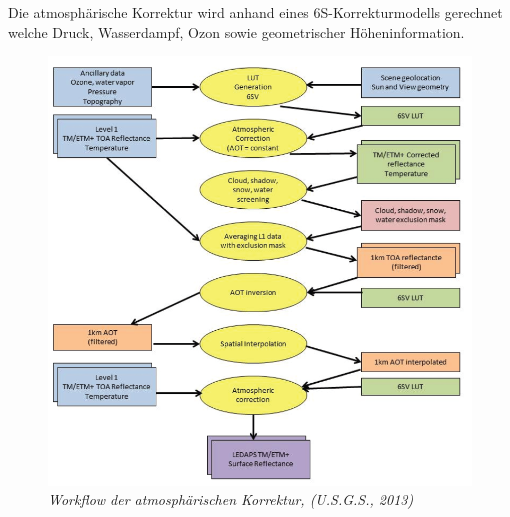 \documentclass[11pt]{report}
\begin{document}
Die atmosphärische Korrektur wird anhand eines 6S-Korrekturmodells gerechnet welche Druck, Wasserdampf, Ozon sowie geometrischer Höheninformation. 
\begin{figure}[H]
\centering
\includegraphics[scale=0.6]{./Grafiken/LEDAPS/Atmospheric_correction_flow_LEDAPS.PNG}
\caption{\textit{Workflow der atmosphärischen Korrektur, (U.S.G.S., 2013)}}
\end{figure}
\end{document}
